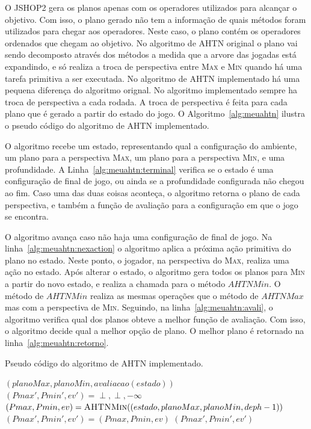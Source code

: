 O JSHOP2 gera os planos apenas com os operadores utilizados para alcançar o objetivo.
Com isso, o plano gerado não tem a informação de quais métodos foram utilizados para chegar aos operadores.
Neste caso, o plano contém os operadores ordenados que chegam ao objetivo.
No algoritmo de AHTN original o plano vai sendo decomposto através dos métodos a medida que a arvore das jogadas está expandindo, e só realiza a troca de perspectiva entre \textsc{Max} e \textsc{Min} quando há uma tarefa primitiva a ser executada.
No algoritmo de AHTN implementado há uma pequena diferença do algoritmo orignal.
No algoritmo implementado sempre ha troca de perspectiva a cada rodada.
A troca de perspectiva é feita para cada plano que é gerado a partir do estado do jogo.
O Algoritmo~\ref{alg:meuahtn} ilustra o pseudo código do algoritmo de AHTN implementado.

O algoritmo recebe um estado, representando qual a configuração do ambiente, um plano para a perspectiva \textsc{Max}, um plano para a perspectiva \textsc{Min}, e uma profundidade.
A Linha~\ref{alg:meuahtn:terminal} verifica se o estado é uma configuração de final de jogo, ou ainda se a profundidade configurada não chegou ao fim.
Caso uma das duas coisas aconteça, o algoritmo retorna o plano de cada perspectiva, e também a função de avaliação para a configuração em que o jogo se encontra.

O algoritmo avança caso não haja uma configuração de final de jogo.
Na linha~\ref{alg:meuahtn:nexaction} o algoritmo aplica a próxima ação primitiva do plano no estado.
Neste ponto, o jogador, na perspectiva do \textsc{Max}, realiza uma ação no estado.
Após alterar o estado, o algoritmo gera todos os planos para \textsc{Min} a partir do novo estado, e realiza a chamada para o método $\mathit{AHTNMin}$.
O método de $\mathit{AHTNMin}$ realiza as mesmas operações que o método de $\mathit{AHTNMax}$ mas com a perspectiva de \textsc{Min}.
Seguindo, na linha~\ref{alg:meuahtn:avali}, o algoritmo verifica qual dos planos obteve a melhor função de avaliação. 
Com isso, o algoritmo decide qual a melhor opção de plano.
O melhor plano é retornado na linha~\ref{alg:meuahtn:retorno}.


\begin{algorithm}[ht]
	\caption{Pseudo código do algoritmo de AHTN implementado.}
	\label{alg:meuahtn}
 	\begin{algorithmic}[1]		
	 		 \label{alg:meuahtn:terminal}
		 		\State	\Return $(planoMax, planoMin, avaliacao(estado))$
	 		\EndIf
	 		 \label{alg:meuahtn:nexaction}
	 		\State $(Pmax', Pmin', ev') = \perp, \perp, -\infty$
			 \label{alg:meuahtn:for}
		 		\State $(Pmax, Pmin, ev) = \Call{AHTNMin}{(estado, planoMax, planoMin, deph-1)}$ \label{alg:meuahtn:ahtnmin}
			 	 \label{alg:meuahtn:avali}
					\State $(Pmax', Pmin', ev') = (Pmax, Pmin, ev)$
				\EndIf		 		 		
		 	\EndFor
		 	\State \Return $(Pmax', Pmin', ev')$ \label{alg:meuahtn:retorno}
 		\EndFunction
 	\end{algorithmic}
 \end{algorithm}
 
